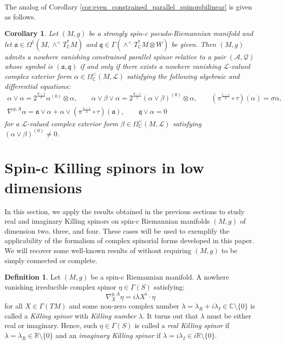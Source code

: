 \documentclass[10pt,a4paper,twoside,reqno]{amsart}
\theoremstyle{plain}
\newtheorem{cor}[thm]{Corollary}
\theoremstyle{definition}
\newtheorem{definition}[thm]{Definition}
\theoremstyle{remark}
\def\C{\mathbb{C}}
\def\R{\mathbb{R}}
\def\cQ{\mathcal{Q}}
\def\fra{\mathfrak{a}}
\def\frq{\mathfrak{q}}
\def\cA{\mathcal{A}}
\def\R{\mathbb{R}}
\def\cL{\mathcal{L}}
\begin{document}
The analog of Corollary \ref{cor:even_constrained_parallel_spinorsbilinear} is given as follows.

\begin{cor}
\label{cor:odd_constrained_parallel_spinorsbilinear}
Let $(M,g)$ be a strongly spin-c pseudo-Riemannian manifold and let $\fra\in\Omega^1(M,\wedge^< T^*_\C M)$ and $\frq\in\Gamma(\wedge^< T^*_\C M\otimes W)$ be given. Then $(M,g)$ admits a nowhere vanishing constrained parallel spinor relative to a pair $(\cA,\cQ)$ whose symbol is $(\fra,\frq)$ if and only if there exists a nowhere vanishing $\cL$-valued complex exterior form $\alpha\in\Omega^<_\C(M,\cL)$ satisfying the following algebraic and differential equations:
\begin{gather*}
    \alpha\vee\alpha=2^{\frac{d-1}{2}}\alpha^{(0)}\otimes\alpha,\qquad \alpha\vee\beta\vee\alpha=2^{\frac{d-1}{2}}(\alpha\vee\beta)^{(0)}\otimes\alpha,\qquad (\pi^{\frac{1-s}{2}}\circ\tau)(\alpha)=\sigma\alpha,\\
    \nabla^{g,A}\alpha=\fra\vee\alpha+\alpha\vee(\pi^{\frac{1-s}{2}}\circ\tau)(\fra),\qquad \frq\vee\alpha=0
\end{gather*} 
for a $\cL$-valued complex exterior form $\beta\in\Omega^<_\C(M,\cL)$ satisfying $(\alpha\vee\beta)^{(0)}\neq0$.
\end{cor}


\section{Spin-c Killing spinors in low dimensions}
\label{sec:lowKilling}


In this section, we apply the results obtained in the previous sections to study real and imaginary Killing spinors on spin-c Riemannian manifolds $(M,g)$ of dimension two, three, and four. These cases will be used to exemplify the applicability of the formalism of complex spinorial forms developed in this paper. We will recover some well-known results of \cite{Moroianu1997,Herzlich_Moroianu_1999,Grosse_Nakad_2015} without requiring $(M,g)$ to be simply connected or complete.

\begin{definition}
    Let $(M,g)$ be a spin-c Riemannian manifold. A nowhere vanishing irreducible complex spinor $\eta\in\Gamma(S)$ satisfying: $$\nabla^{g,A}_X\eta=i\lambda X^\flat\cdot\eta$$ for all $X\in\Gamma(TM)$ and some non-zero complex number $\lambda=\lambda_R+i\lambda_I\in\C\setminus\{0\}$ is called a \emph{Killing spinor} with \emph{Killing number} $\lambda$. It turns out that $\lambda$ must be either real or imaginary. Hence, such $\eta\in\Gamma(S)$ is called a \emph{real Killing spinor} if $\lambda=\lambda_R\in\R\setminus\{0\}$ and an \emph{imaginary Killing spinor} if $\lambda=i\lambda_I\in i\R\setminus\{0\}$.
\end{definition}
\end{document}
